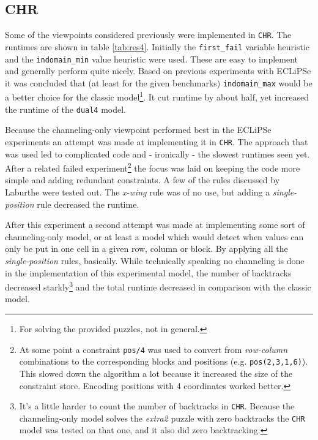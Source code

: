 \subsection{CHR}

Some of the viewpoints considered previously were implemented in \texttt{CHR}. The runtimes are shown in table \ref{tab:res4}. Initially the \texttt{first\_fail} variable heuristic and the \texttt{indomain\_min} value heuristic were used. These are easy to implement and generally perform quite nicely. Based on previous experiments with ECLiPSe it was concluded that (at least for the given benchmarks) \texttt{indomain\_max} would be a better choice for the classic model\footnote{For solving the provided puzzles, not in general.}. It cut runtime by about half, yet increased the runtime of the \texttt{dual4} model.\\\par 

Because the channeling-only viewpoint performed best in the ECLiPSe experiments an attempt was made at implementing it in \texttt{CHR}. The approach that was used led to complicated code and - ironically - the slowest runtimes seen yet. After a related failed experiment\footnote{At some point a constraint \texttt{pos/4} was used to convert from \textit{row-column} combinations to the corresponding blocks and positions (e.g. \texttt{pos(2,3,1,6)}). This slowed down the algorithm a lot because it increased the size of the constraint store. Encoding positions with 4 coordinates worked better.} the focus was laid on keeping the code more simple and adding redundant constraints. A few of the rules discussed by Laburthe \cite{article:laburthe} were tested out. The \textit{x-wing} rule was of no use, but adding a \textit{single-position} rule decreased the runtime. \\\par

After this experiment a second attempt was made at implementing some sort of channeling-only model, or at least a model which would detect when values can only be put in one cell in a given row, column or block. By applying all the \textit{single-position} rules, basically. While technically speaking no channeling is done in the implementation of this experimental model, the number of backtracks decreased starkly\footnote{It's a little harder to count the number of backtracks in \texttt{CHR}. Because the channeling-only model solves the \textit{extra2} puzzle with zero backtracks the \texttt{CHR} model was tested on that one, and it also did zero backtracking.} and the total runtime decreased in comparison with the classic model.\\\par

